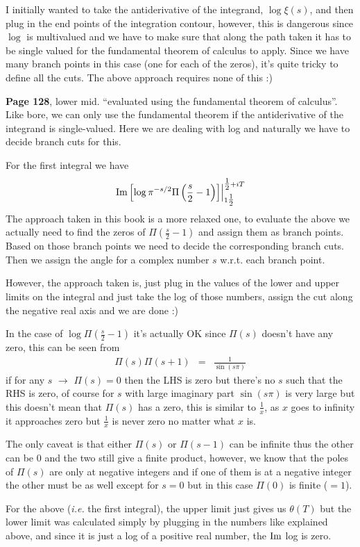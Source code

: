\documentclass[aps,preprint,preprintnumbers,nofootinbib,showpacs,prd]{revtex4-1}
\newcommand{\ie}{{\it i.e.} }
\newcommand{\nbea}{\begin{eqnarray*}}
\newcommand{\neea}{\end{eqnarray*}}
\def\Im{{\rm Im}}
\begin{document}
I initially wanted to take the antiderivative of the integrand, $\log \xi(s)$, and then plug in the end points of the integration contour, however, this is dangerous since $\log$ is multivalued and we have to make sure that along the path taken it has to be single valued for the fundamental theorem of calculus to apply. Since we have many branch points in this case (one for each of the zeros), it's quite tricky to define all the cuts. The above approach requires none of this :)

{\bf Page 128}, lower mid. ``evaluated using the fundamental theorem of calculus''. Like bore, we can only use the fundamental theorem if the antiderivative of the integrand is single-valued. Here we are dealing with log and naturally we have to decide branch cuts for this.

For the first integral we have 
%
\nbea
\left.\Im\left\lbrack \log \pi^{-s/2} \Pi\left(\frac{s}{2} - 1\right)\right\rbrack\right|_{1\tfrac{1}{2}}^{\tfrac{1}{2} + iT}
\neea
%
The approach taken in this book is a more relaxed one, to evaluate the above we actually need to find the zeros of $\Pi\left(\frac{s}{2} - 1\right)$ and assign them as branch points. Based on those branch points we need to decide the corresponding branch cuts. Then we assign the angle for a complex number $s$ w.r.t. each branch point.

However, the approach taken is, just plug in the values of the lower and upper limits on the integral and just take the log of those numbers, assign the cut along the negative real axis and we are done :)

In the case of $\log \Pi(\tfrac{s}{2} - 1)$ it's actually OK since $\Pi(s)$ doesn't have any zero, this can be seen from
%
\nbea
\Pi(s) \Pi(s+1) & = & \frac{1}{\sin(s\pi)}
\neea
%
if for any $s$ $\to$ $\Pi(s) = 0$ then the LHS is zero but there's no $s$ such that the RHS is zero, of course for $s$ with large imaginary part $\sin(s\pi)$ is very large but this doesn't mean that $\Pi(s)$ has a zero, this is similar to $\tfrac{1}{x}$, as $x$ goes to infinity it approaches zero but $\tfrac{1}{x}$ is never zero no matter what $x$ is.

The only caveat is that either $\Pi(s)$ or $\Pi(s-1)$ can be infinite thus the other can be 0 and the two still give a finite product, however, we know that the poles of $\Pi(s)$ are only at negative integers and if one of them is at a negative integer the other must be as well except for $s = 0$ but in this case $\Pi(0)$ is finite ($= 1$).

For the above (\ie the first integral), the upper limit just gives us $\theta(T)$ but the lower limit was calculated simply by plugging in the numbers like explained above, and since it is just a log of a positive real number, the $\Im$ log is zero.
\end{document}
